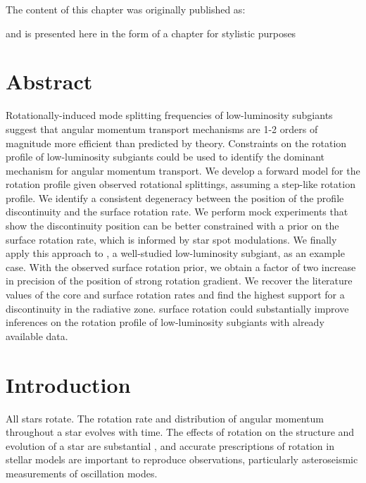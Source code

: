 The content of this chapter was originally published as:
\begin{quote}
	\citet*{tanner_ast}
\end{quote}
and is presented here in the form of a chapter for stylistic purposes 

\newpage

\section*{Abstract}

Rotationally-induced mode splitting frequencies of low-luminosity subgiants suggest that angular momentum transport mechanisms are 1-2 orders of magnitude more efficient  than predicted by theory. Constraints on the rotation profile of low-luminosity subgiants could be used to identify the dominant mechanism for angular momentum transport. We develop a forward model for the rotation profile given observed rotational splittings, assuming a step-like rotation profile. We identify a consistent degeneracy between the position of the profile discontinuity and the surface rotation rate. We perform mock experiments that show the discontinuity position can be better constrained with a prior on the surface rotation rate, which is informed by star spot modulations. We finally apply this approach to \thestar, a well-studied low-luminosity subgiant, as an example case. With the observed surface rotation prior, we obtain a factor of two increase in precision of the position of strong rotation gradient. We recover the literature values of the core and surface rotation rates and find the highest support for a discontinuity in the radiative zone. surface rotation could substantially improve inferences on the rotation profile of low-luminosity subgiants with already available data.


\section{Introduction}
\label{sec:intro}

All stars rotate. The rotation rate and distribution of angular momentum throughout a star evolves with time. The effects of rotation on the structure and evolution of a star are substantial \citep[e.g.][]{heger_presupernova_1998,maeder_evolution_2000}, and accurate prescriptions of rotation in stellar models are important to reproduce observations, particularly asteroseismic measurements of oscillation modes.

